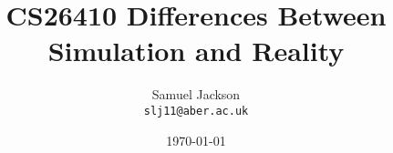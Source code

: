 \documentclass{article}
\begin{document}
\title{CS26410 Differences Between Simulation and Reality}
\author{Samuel Jackson \\ \texttt{slj11@aber.ac.uk}}
\date{\today}
\maketitle
\end{document}
